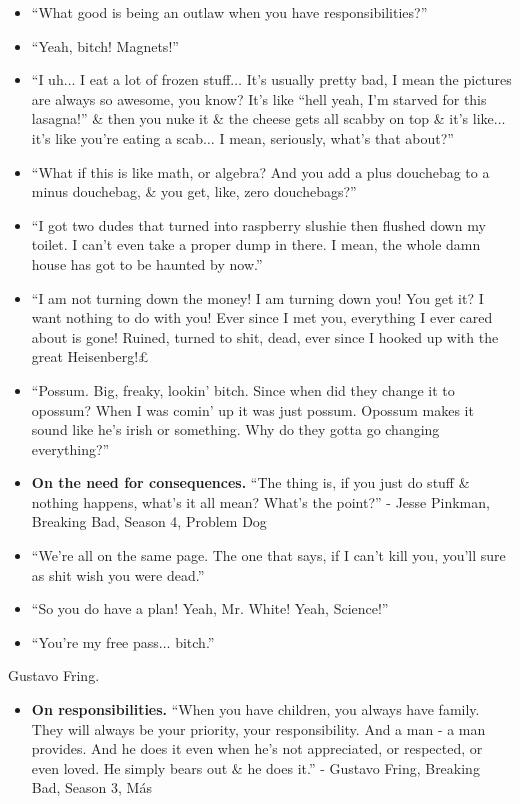 \documentclass{article}
\begin{document}
\begin{enumerate}
\begin{itemize}
		\item ``What good is being an outlaw when you have responsibilities?''
		\item ``Yeah, bitch! Magnets!''
		\item ``I uh$\ldots$ I eat a lot of frozen stuff$\ldots$ It's usually pretty bad, I mean the pictures are always so awesome, you know? It's like ``hell yeah, I'm starved for this lasagna!'' \& then you nuke it \& the cheese gets all scabby on top \& it's like$\ldots$ it's like you're eating a scab$\ldots$ I mean, seriously, what's that about?''
		\item ``What if this is like math, or algebra? And you add a plus douchebag to a minus douchebag, \& you get, like, zero douchebags?''
		\item ``I got two dudes that turned into raspberry slushie then flushed down my toilet. I can't even take a proper dump in there. I mean, the whole damn house has got to be haunted by now.''
		\item ``I am not turning down the money! I am turning down you! You get it? I want nothing to do with you! Ever since I met you, everything I ever cared about is gone! Ruined, turned to shit, dead, ever since I hooked up with the great Heisenberg!£
		\item ``Possum. Big, freaky, lookin' bitch. Since when did they change it to opossum? When I was comin' up it was just possum. Opossum makes it sound like he's irish or something. Why do they gotta go changing everything?''
		\item {\bf On the need for consequences.} ``The thing is, if you just do stuff \& nothing happens, what's it all mean? What's the point?'' - Jesse Pinkman, Breaking Bad, Season 4, Problem Dog
		\item ``We're all on the same page. The one that says, if I can't kill you, you'll sure as shit wish you were dead.''
		\item ``So you do have a plan! Yeah, Mr. White! Yeah, Science!''
		\item ``You're my free pass$\ldots$ bitch.''
	\end{itemize}
	{\sc Gustavo Fring.}
	\begin{itemize}
		\item {\bf On responsibilities.} ``When you have children, you always have family. They will always be your priority, your responsibility. And a man - a man provides. And he does it even when he's not appreciated, or respected, or even loved. He simply bears out \& he does it.'' - Gustavo Fring, Breaking Bad, Season 3, Más

\end{itemize}
\end{enumerate}
\end{document}
